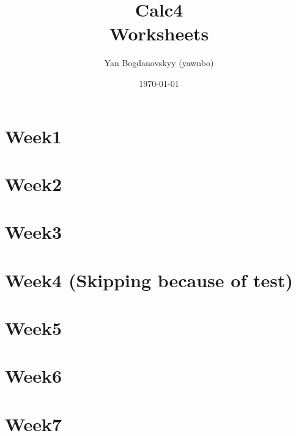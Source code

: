 \documentclass{report}
\title{\Huge{Calc4}\\ Worksheets}
\author{\huge{Yan Bogdanovskyy (yawnbo)}}
\date{\today}
\begin{document}
\maketitle
\tableofcontents
\pagebreak

\begin{multicols}{2}
\chapter{Week1}


\chapter{Week2}


\chapter{Week3}


\chapter{Week4 (Skipping because of test) }
\chapter{Week5}


\chapter{Week6}


\chapter{Week7}


\end{multicols}
\end{document}
